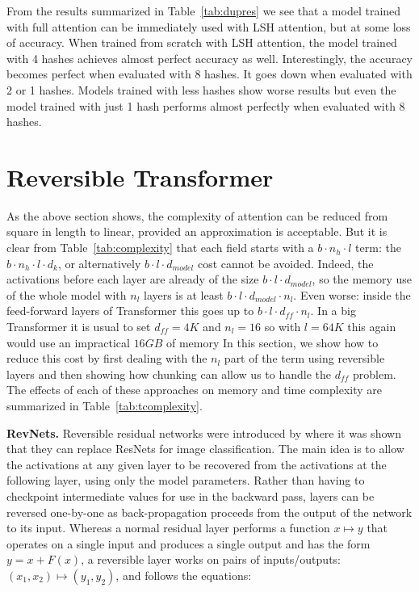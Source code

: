 From the results summarized in Table~\ref{tab:dupres} we see that a model trained with full attention can be immediately used with LSH attention, but at some loss of accuracy. When trained from scratch with LSH attention, the model trained with 4 hashes achieves almost perfect accuracy as well. Interestingly, the accuracy becomes perfect when evaluated with 8 hashes. It goes down when evaluated with 2 or 1 hashes. Models trained with less hashes show worse results but even the model trained with just 1 hash performs almost perfectly when evaluated with 8 hashes.

\section{Reversible Transformer} \label{sec:reversible}

As the above section shows, the complexity of attention can be reduced from square in length to linear, provided an approximation is acceptable. But it is clear from Table~\ref{tab:complexity} that each field starts with a $b\cdot n_h\cdot l$ term: the $b\cdot n_h\cdot l\cdot d_k$, or alternatively $b\cdot l\cdot d_{model}$ cost cannot be avoided. Indeed, the activations before each layer are already of the size $b\cdot l\cdot d_{model}$, so the memory use of the whole model with $n_l$ layers is at least $b\cdot l\cdot d_{model}\cdot n_l$. Even worse: inside the feed-forward layers of Transformer this goes up to $b\cdot l\cdot d_{ff}\cdot n_l$. In a big Transformer it is usual to set $d_{ff}=4K$ and $n_l=16$ so with $l=64K$ this again would use an impractical $16GB$ of memory In this section, we show how to reduce this cost by first dealing with the $n_l$ part of the term using reversible layers and then showing how chunking can allow us to handle the $d_{ff}$ problem. The effects of each of these approaches on memory and time complexity are summarized in Table~\ref{tab:tcomplexity}.

\textbf{RevNets.}
Reversible residual networks were introduced by \citet{gomez2017reversible} where it was shown that they can replace ResNets for image classification. The main idea is to allow the activations at any given layer to be recovered from the activations at the following layer, using only the model parameters. Rather than having to checkpoint intermediate values for use in the backward pass, layers can be reversed one-by-one as back-propagation proceeds from the output of the network to its input. Whereas a normal residual layer performs a function $x \mapsto y$ that operates on a single input and produces a single output and has the form $y = x + F(x)$, a reversible layer works on pairs of inputs/outputs: $(x_1, x_2) \mapsto (y_1, y_2)$, and follows the equations:

